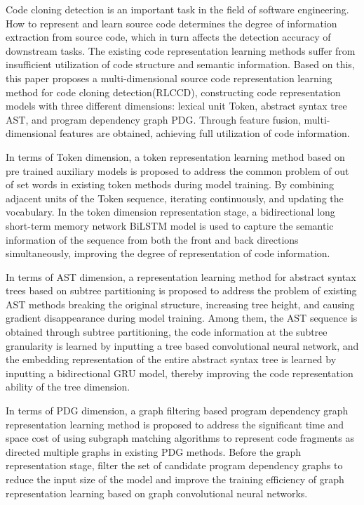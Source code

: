\begin{abstractEn}

  Code cloning detection is an important task in the field of software engineering. How to represent and learn source code determines the degree of information extraction from source code, which in turn affects the detection accuracy of downstream tasks. The existing code representation learning methods suffer from insufficient utilization of code structure and semantic information. Based on this, this paper proposes a multi-dimensional source code representation learning method for code cloning detection(RLCCD), constructing code representation models with three different dimensions: lexical unit Token, abstract syntax tree AST, and program dependency graph PDG. Through feature fusion, multi-dimensional features are obtained, achieving full utilization of code information.


  In terms of Token dimension, a token representation learning method based on pre trained auxiliary models is proposed to address the common problem of out of set words in existing token methods during model training. By combining adjacent units of the Token sequence, iterating continuously, and updating the vocabulary. In the token dimension representation stage, a bidirectional long short-term memory network BiLSTM model is used to capture the semantic information of the sequence from both the front and back directions simultaneously, improving the degree of representation of code information.

  In terms of AST dimension, a representation learning method for abstract syntax trees based on subtree partitioning is proposed to address the problem of existing AST methods breaking the original structure, increasing tree height, and causing gradient disappearance during model training. Among them, the AST sequence is obtained through subtree partitioning, the code information at the subtree granularity is learned by inputting a tree based convolutional neural network, and the embedding representation of the entire abstract syntax tree is learned by inputting a bidirectional GRU model, thereby improving the code representation ability of the tree dimension.

  In terms of PDG dimension, a graph filtering based program dependency graph representation learning method is proposed to address the significant time and space cost of using subgraph matching algorithms to represent code fragments as directed multiple graphs in existing PDG methods. Before the graph representation stage, filter the set of candidate program dependency graphs to reduce the input size of the model and improve the training efficiency of graph representation learning based on graph convolutional neural networks.


\end{abstractEn}
